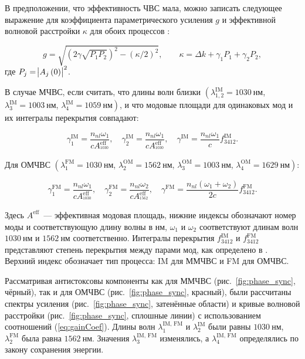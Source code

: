 \documentclass{article}
\DeclareMathOperator{\LPoi}{\text{LP}_{\text{01}}}
\DeclareMathOperator{\LPii}{\text{LP}_{\text{11}}}
\begin{document}
	В предположении, что эффективность ЧВС мала, можно записать следующее выражение для коэффициента параметрического усиления $g$ и эффективной волновой расстройки $\kappa$ для обоих процессов \cite{stolen1982parametric}:
	
	\begin{equation}
		g=\sqrt{\left(2\gamma\sqrt{P_1 P_2}\right)^2-\left(\kappa/2\right)^2}, \qquad 	\kappa = \Delta k + \gamma_1 P_1+\gamma_2 P_2,
		\label{eq:gainCoef}
	\end{equation}
	где $P_j=\abs{A_j\left(0\right)}^2$.
	
	В случае МЧВС, если считать, что длины волн близки $\left(\lambda^{\text{IM}}_{1,2}=1030~\text{нм}\right.$, $\left.\lambda^{\text{IM}}_3=1003~\text{нм}\right.$, $\left.\lambda^{\text{IM}}_4=1059~\text{нм}\right)$, и что модовые площади для одинаковых мод и их интегралы перекрытия совпадают:
	
	\begin{equation}
			\gamma_1^{\text{IM}}=\frac{n_{nl}\omega_1}{c A^{\text{eff}}_{\LPoi^{1030}}}, \quad
			\gamma_2^{\text{IM}}=\frac{n_{nl}\omega_1}{c A^{\text{eff}}_{\LPii^{1030}}}, \quad
			\gamma^{\text{IM}}=\frac{n_{nl}\omega_1}{c}f^{\text{IM}}_{3412}.
	\end{equation}
	
	Для ОМЧВС $\left(\lambda_1^{\text{FM}}= 1030~\text{нм}\right.$, $\left.\lambda_2^{\text{OM}}=1562~\text{нм}\right.$, $\left.\lambda_3^{\text{OM}}=1003~\text{нм}\right.$, $\left.\lambda_4^{\text{OM}}=1629~\text{нм}\right)$:
	
	\begin{equation}
		\gamma_1^{\text{FM}}=\frac{n_{nl}\omega_1}{c A^{\text{eff}}_{\LPoi^{1030}}},\quad
		\gamma_2^{\text{FM}}=\frac{n_{nl}\omega_2}{c A^{\text{eff}}_{\LPoi^{1562}}},\quad
		\gamma^{\text{FM}}=\frac{n_{nl}\left(\omega_1+\omega_2\right)}{2c}f^{\text{FM}}_{3412}.
	\end{equation}
	
	Здесь $A^{\text{eff}}$~--- эффективная модовая площадь, нижние индексы обозначают номер моды и соответствующую длину волны в нм, $\omega_1$ и $\omega_2$ соответствуют длинам волн $1030~\text{нм}$ и $1562~\text{нм}$ соответственно. Интегралы перекрытия $f^{\text{IM}}_{3412}$ и $f^{\text{FM}}_{3412}$ представляют степень перекрытия между парами мод, как определено в \cite{stolen1982parametric}. Верхний индекс обозначает тип процесса: IM для ММЧВС и FM для ОМЧВС.
	
	Рассматривая антистоксовы компоненты как для ММЧВС (рис.~\ref{fig:phase_sync}, чёрный), так и для ОМЧВС (рис.~\ref{fig:phase_sync}, красный), были рассчитаны спектры усиления (рис.~\ref{fig:phase_sync}, затенённые области) и кривые волновой расстройки (рис.~\ref{fig:phase_sync}, сплошные линии) с использованием соотношений (\ref{eq:gainCoef}). Длины волн $\lambda^{\text{IM, FM}}_1$ и $\lambda^{\text{IM}}_2$ были равны $1030~\text{нм}$, $\lambda^{\text{FM}}_2$ была равна $1562~\text{нм}$. Значения $\lambda^{\text{IM, FM}}_3$ изменялись, а $\lambda^{\text{IM, FM}}_4$ определялись по закону сохранения энергии.
	
\end{document}
